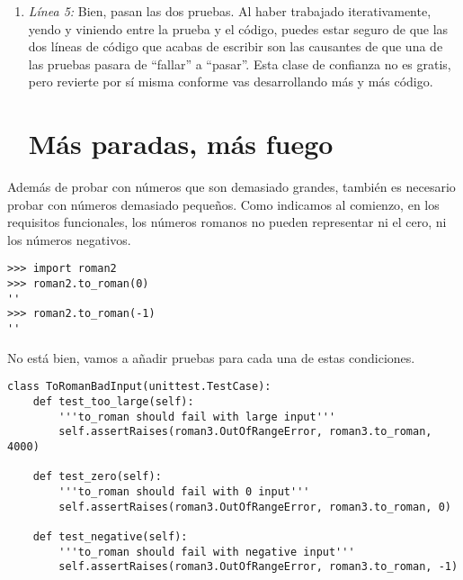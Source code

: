 \begin{enumerate}

\item \emph{Línea 5:} Bien, pasan las dos pruebas. Al haber trabajado iterativamente, yendo y viniendo entre la prueba y el código, puedes estar seguro de que las dos líneas de código que acabas de escribir son las causantes de que una de las pruebas pasara de ``fallar'' a ``pasar''. Esta clase de confianza no es gratis, pero revierte por sí misma conforme vas desarrollando más y más código.

\section{Más paradas, más fuego}

\end{enumerate}

Además de probar con números que son demasiado grandes, también es necesario probar con números demasiado pequeños. Como indicamos al comienzo, en los requisitos funcionales, los números romanos no pueden representar ni el cero, ni los números negativos.

\noindent\begin{minipage}{\textwidth}
\begin{lstlisting}[mathescape=True]
>>> import roman2
>>> roman2.to_roman(0)
''
>>> roman2.to_roman(-1)
''
\end{lstlisting}
\end{minipage}

No está bien, vamos a añadir pruebas para cada una de estas condiciones.

\noindent\begin{minipage}{\textwidth}
\begin{lstlisting}[mathescape=True]
class ToRomanBadInput(unittest.TestCase):
    def test_too_large(self):
        '''to_roman should fail with large input'''
        self.assertRaises(roman3.OutOfRangeError, roman3.to_roman, 4000)

    def test_zero(self):
        '''to_roman should fail with 0 input'''
        self.assertRaises(roman3.OutOfRangeError, roman3.to_roman, 0)

    def test_negative(self):
        '''to_roman should fail with negative input'''
        self.assertRaises(roman3.OutOfRangeError, roman3.to_roman, -1)
\end{lstlisting}
\end{minipage}

